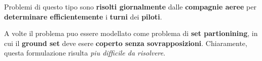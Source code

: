 \begin{remark}
    Problemi di questo tipo sono \textbf{risolti giornalmente}
    dalle \textbf{compagnie aeree} per \textbf{determinare efficientemente}
    i \textbf{turni} dei \textbf{piloti}.
\end{remark}

\begin{remark}
    A volte il problema puo essere modellato come
    problema di \textbf{set partionining}, in cui il
    \textbf{ground set} deve esere \textbf{coperto senza sovrapposizioni}.
    Chiaramente, questa formulazione risulta \textit{piu difficile da risolvere}.
\end{remark}

